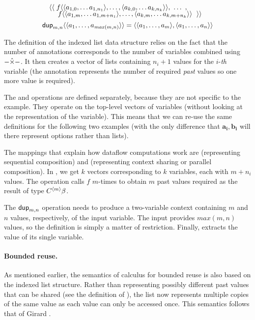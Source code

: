 \begin{example}
\begin{equation*}
\begin{array}{l}
\quad \langle\langle\; f \langle \langle a_{1,0}, \ldots a_{1,{n_1}} \rangle, \ldots, \langle a_{k,0}, \ldots a_{k,{n_k}} \rangle \rangle, ~\ldots~, \\[-0.25em]
\quad ~~~\; f \langle \langle a_{1,m}, \ldots a_{1,m+{n_1}} \rangle, \ldots, \langle a_{k,m}, \ldots a_{k,m+{n_k}} \rangle \rangle~\; \rangle\rangle
\\[0.45em]
\textnormal{\sffamily dup}_{m, n} \langle \langle a_1, \ldots, a_{\mathit{max}(m,n)} \rangle \rangle =
   \langle \langle a_1, \ldots, a_m \rangle, \langle a_1, \ldots, a_n \rangle \rangle
\end{array}
\end{equation*}
\end{example}

\noindent
The definition of the indexed list data structure relies on the fact that the number of annotations
corresponds to the number of variables combined using $-\hat{\times}-$. It then creates a vector of lists
containing $n_i+1$ values for the $i$-\textit{th} variable (the annotation represents the number of
required \emph{past} values so one more value is required).

The  and  operations are defined separately, because they are not specific
to the example. They operate on the top-level vectors of variables (without looking at the
representation of the variable). This means that we can re-use the same definitions for the following
two examples (with the only difference that $\mathbf{a_i}, \mathbf{b_i}$ will there represent options
rather than lists).

The mappings that explain how dataflow computations work are  (representing sequential
composition) and  (representing context sharing or parallel composition). In ,
we get $k$ vectors corresponding to $k$ variables, each with $m+n_i$ values. The operation calls
$f$ $m$-times to obtain $m$ past values required as the result of type $C^{\langle m \rangle}\beta$.

The $\textnormal{\sffamily dup}_{m,n}$ operation needs to produce a two-variable context containing $m$ and $n$ values,
respectively, of the input variable. The input provides $\mathit{max}(m, n)$ values, so the definition
is simply a matter of restriction. Finally,  extracts the value of its single variable.

\paragraph{Bounded reuse.}
As mentioned earlier, the semantics of calculus for bounded reuse is also based on the indexed list
structure. Rather than representing possibly different past values that can be shared (see the
definition of ), the list now represents multiple copies of the same value as each value
can only be accessed once. This semantics follows that of Girard \cite{logic-bounded}.

